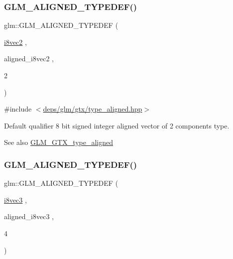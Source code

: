 \subsubsection{\texorpdfstring{G\+L\+M\+\_\+\+A\+L\+I\+G\+N\+E\+D\+\_\+\+T\+Y\+P\+E\+D\+E\+F()}{GLM\_ALIGNED\_TYPEDEF()}\hspace{0.1cm}{\footnotesize\ttfamily [54/209]}}
{\footnotesize\ttfamily glm\+::\+G\+L\+M\+\_\+\+A\+L\+I\+G\+N\+E\+D\+\_\+\+T\+Y\+P\+E\+D\+EF (\begin{DoxyParamCaption}\item[{\hyperlink{group__gtc__type__precision_gade57e4b55fe2b2345a4f2ac2b149cd32}{i8vec2}}]{,  }\item[{aligned\+\_\+i8vec2}]{,  }\item[{2}]{ }\end{DoxyParamCaption})}



{\ttfamily \#include $<$\hyperlink{gtx_2type__aligned_8hpp}{deps/glm/gtx/type\+\_\+aligned.\+hpp}$>$}

Default qualifier 8 bit signed integer aligned vector of 2 components type. \begin{DoxySeeAlso}{See also}
\hyperlink{group__gtx__type__aligned}{G\+L\+M\+\_\+\+G\+T\+X\+\_\+type\+\_\+aligned} 
\end{DoxySeeAlso}
\mbox{\label{group__gtx__type__aligned_ga2958f907719d94d8109b562540c910e2}} 
\subsubsection{\texorpdfstring{G\+L\+M\+\_\+\+A\+L\+I\+G\+N\+E\+D\+\_\+\+T\+Y\+P\+E\+D\+E\+F()}{GLM\_ALIGNED\_TYPEDEF()}\hspace{0.1cm}{\footnotesize\ttfamily [55/209]}}
{\footnotesize\ttfamily glm\+::\+G\+L\+M\+\_\+\+A\+L\+I\+G\+N\+E\+D\+\_\+\+T\+Y\+P\+E\+D\+EF (\begin{DoxyParamCaption}\item[{\hyperlink{group__gtc__type__precision_ga9babb834daa1f84c23821bd21669c2e8}{i8vec3}}]{,  }\item[{aligned\+\_\+i8vec3}]{,  }\item[{4}]{ }\end{DoxyParamCaption})}



